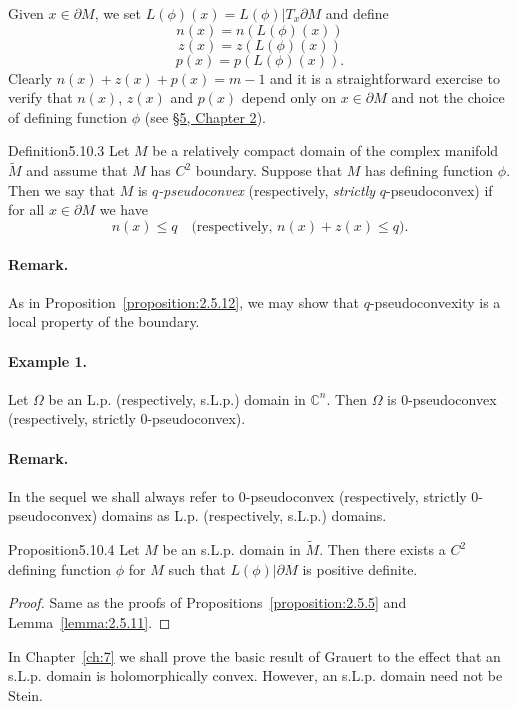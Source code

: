 Given $x\in\partial M$, we set $L(\phi)(x)=L(\phi)|T_x\partial M$ and define
\[n(x)=n(L(\phi)(x))\]
\[z(x)=z(L(\phi)(x))\]
\[p(x)=p(L(\phi)(x)).\]
Clearly $n(x)+z(x)+p(x)=m-1$ and it is a straightforward exercise to verify that $n(x)$, $z(x)$ and $p(x)$ depend only on $x\in\partial M$ and not the choice of defining function $\phi$ (see \hyperref[sec:2:5]{\S5, Chapter 2}).
\begin{originaltheorem}{Definition}{5.10.3}
Let $M$ be a relatively compact domain of the complex manifold $\widetilde M$ and assume that $M$ has $C^2$ boundary. Suppose that $M$ has defining function $\phi$. Then we say that $M$ is \emph{$q$-pseudoconvex} (respectively, \emph{strictly} $q$-pseudoconvex) if for all $x\in\partial M$ we have
\[n(x)\leq q\quad\text{(respectively, }n(x)+z(x)\leq q\text{)}.\]
\end{originaltheorem}
\paragraph{Remark.} As in Proposition~\ref{proposition:2.5.12}, we may show that $q$-pseudoconvexity is a local property of the boundary.
\paragraph{Example 1.} Let $\Omega$ be an L.p. (respectively, s.L.p.) domain in $\mathbb C^n$. Then $\Omega$ is 0-pseudoconvex (respectively, strictly 0-pseudoconvex).
\paragraph{Remark.} In the sequel we shall always refer to 0-pseudoconvex (respectively, strictly 0-pseudoconvex) domains as L.p. (respectively, s.L.p.) domains.
\begin{originaltheorem}{Proposition}{5.10.4}
Let $M$ be an s.L.p. domain in $\widetilde M$. Then there exists a $C^2$ defining function $\phi$ for $M$ such that $L(\phi)|\partial M$ is positive definite.
\end{originaltheorem}
\begin{proof} Same as the proofs of Propositions~\ref{proposition:2.5.5} and Lemma~\ref{lemma:2.5.11}. \end{proof}
In Chapter~\ref{ch:7} we shall prove the basic result of Grauert to the effect that an s.L.p. domain is holomorphically convex. However, an s.L.p. domain need not be Stein.
